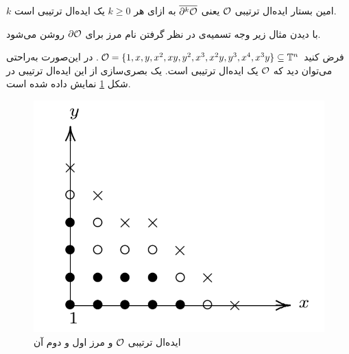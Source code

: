 \begin{corollary}
$k$
امین بستار ایده‌ال ترتیبی 
${\mathcal O}$
یعنی 
$\overline{\partial^{k}\mathcal{O}}$
به ازای هر 
$k\geq 0$
یک ایده‌ال ترتیبی است.
\end{corollary}
با دیدن مثال زیر وجه تسمیه‌ی در نظر گرفتن نام مرز برای 
$\partial\mathcal{O}$
روشن می‌شود.
\begin{example}
فرض  کنید 
${\mathcal O} = \{1, x, y, x^{2}, xy, y^{2}, x^{3}, x^{2}y, y^{3}, x^{4}, x^{3}y\}\subseteq \mathbb{T}^{n}$.
در این‌صورت به‌راحتی می‌توان دید که 
${\mathcal O}$
یک ایده‌ال ترتیبی است. یک بصری‌سازی از این ایده‌ال ترتیبی در شکل 
\ref{fig:border1}
نمایش داده شده است.
\begin{figure}
	\centering
	\includegraphics[width=0.4\linewidth]{Images/border1}
	\caption{ایده‌ال ترتیبی 
		${\mathcal O}$
		و مرز اول و دوم آن}
	\label{fig:border1}
\end{figure}
\end{example}

